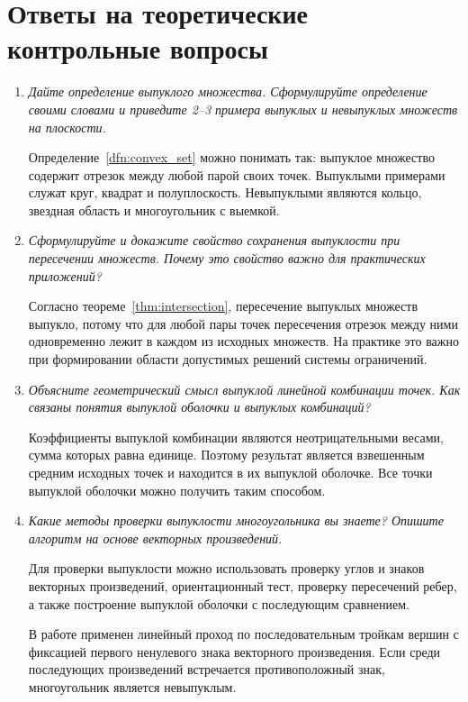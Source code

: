 \section{Ответы на теоретические контрольные вопросы}

\begin{enumerate}
    \item
    \textit{Дайте определение выпуклого множества. Сформулируйте
    определение своими словами и приведите 2--3 примера выпуклых и
    невыпуклых множеств на плоскости.}

    Определение~\ref{dfn:convex_set} можно понимать так: выпуклое множество содержит отрезок между любой парой своих точек.
    Выпуклыми примерами служат круг, квадрат и полуплоскость.
    Невыпуклыми являются кольцо, звездная область и многоугольник
    с выемкой.

    \item
    \textit{Сформулируйте и докажите свойство сохранения выпуклости при
    пересечении множеств. Почему это свойство важно для практических
    приложений?}

    Согласно теореме~\ref{thm:intersection}, пересечение выпуклых
    множеств выпукло, потому что для любой пары точек пересечения
    отрезок между ними одновременно лежит в каждом из исходных множеств.
    На практике это важно при формировании области допустимых решений
    системы ограничений.

    \item
    \textit{Объясните геометрический смысл выпуклой линейной комбинации
    точек. Как связаны понятия выпуклой оболочки и выпуклых комбинаций?}

    Коэффициенты выпуклой комбинации являются неотрицательными весами,
    сумма которых равна единице. Поэтому результат является взвешенным
    средним исходных точек и находится в их выпуклой оболочке. Все точки
    выпуклой оболочки можно получить таким способом.

    \item
    \textit{Какие методы проверки выпуклости многоугольника вы знаете?
    Опишите алгоритм на основе векторных произведений.}

    Для проверки выпуклости можно использовать проверку углов и знаков
    векторных произведений, ориентационный тест, проверку пересечений
    ребер, а также построение выпуклой оболочки с последующим сравнением.

    В работе применен линейный проход по последовательным тройкам вершин
    с фиксацией первого ненулевого знака векторного произведения. Если
    среди последующих произведений встречается противоположный знак,
    многоугольник является невыпуклым.


\end{enumerate}
